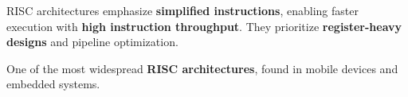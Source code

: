 \begin{NxSSBox}
	\begin{NxIDBox}
		RISC architectures emphasize \textbf{simplified instructions}, enabling faster execution with \textbf{high instruction throughput}. They prioritize \textbf{register-heavy designs} and pipeline optimization.
	\end{NxIDBox}
	\begin{NxIDBoxL}
		 One of the most widespread \textbf{RISC architectures}, found in mobile devices and embedded systems.
	\end{NxIDBoxL}
\end{NxSSBox}

%
%
%
%


